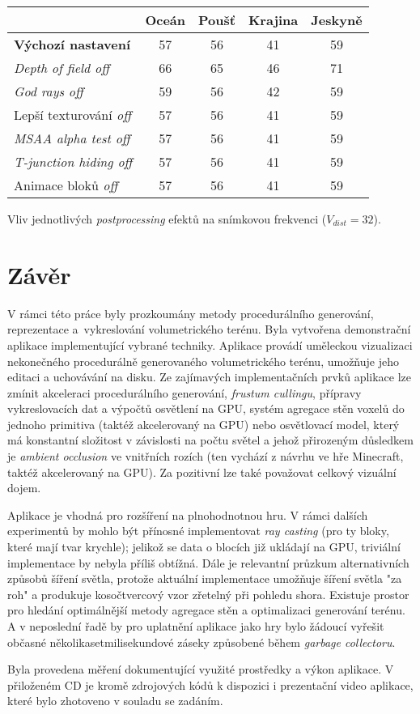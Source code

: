 \begin{tableFloat}[H]
	\centering
	\def\arraystretch{1.1}
	\begin{tabular}{l || c | c | c | c}
		& Oceán & Poušť & Krajina & Jeskyně \\ \hline \hline
		\textbf{Výchozí nastavení} & 57 & 56 & 41 & 59 \\ \hline
		\textit{Depth of field off} & 66 & 65 & 46 & 71 \\
		\textit{God rays off} & 59 & 56 & 42 & 59 \\
		Lepší texturování \textit{off} & 57 & 56 & 41 & 59 \\
		\textit{MSAA alpha test off} & 57 & 56 & 41 & 59 \\
		\textit{T-junction hiding off} & 57 & 56 & 41 & 59 \\
		Animace bloků \textit{off} & 57 & 56 & 41 & 59
	\end{tabular}
	\caption{Vliv jednotlivých \textit{postprocessing} efektů na snímkovou frekvenci ($V_{dist} = 32$).}
\end{tableFloat}

\chapter{Závěr}
V rámci této práce byly prozkoumány metody procedurálního generování, reprezentace a~vykreslování volumetrického terénu. Byla vytvořena demonstrační aplikace implementující vybrané techniky. Aplikace provádí uměleckou vizualizaci nekonečného procedurálně generovaného volumetrického terénu, umožňuje jeho editaci a uchovávání na disku. Ze zajímavých implementačních prvků aplikace lze zmínit akceleraci procedurálního generování, \textit{frustum cullingu}, přípravy vykreslovacích dat a výpočtů osvětlení na GPU, systém agregace stěn voxelů do jednoho primitiva (taktéž akcelerovaný na GPU) nebo osvětlovací model, který má konstantní složitost v závislosti na počtu světel a jehož přirozeným důsledkem je \textit{ambient occlusion} ve vnitřních rozích (ten vychází z návrhu ve hře Minecraft, taktéž akcelerovaný na GPU). Za pozitivní lze také považovat celkový vizuální dojem.

Aplikace je vhodná pro rozšíření na plnohodnotnou hru. V rámci dalších experimentů by mohlo být přínosné implementovat \textit{ray casting} (pro ty bloky, které mají tvar krychle); jelikož se data o blocích již ukládají na GPU, triviální implementace by nebyla příliš obtížná. Dále je relevantní průzkum alternativních způsobů šíření světla, protože aktuální implementace umožňuje šíření světla "za roh" a produkuje kosočtvercový vzor zřetelný při pohledu shora. Existuje prostor pro hledání optimálnější metody agregace stěn a optimalizaci generování terénu. A v neposlední řadě by pro uplatnění aplikace jako hry bylo žádoucí vyřešit občasné několikasetmilisekundové záseky způsobené během \textit{garbage collectoru}.

Byla provedena měření dokumentující využité prostředky a výkon aplikace. V přiloženém CD je kromě zdrojových kódů k dispozici i prezentační video aplikace, které bylo zhotoveno v souladu se zadáním.